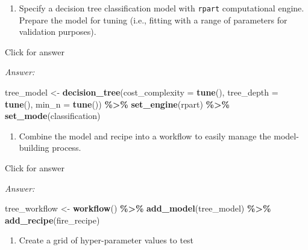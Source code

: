 \documentclass[
]{book}
\newenvironment{Shaded}{\begin{snugshade}}{\end{snugshade}}
\newcommand{\AttributeTok}[1]{\textcolor[rgb]{0.13,0.29,0.53}{#1}}
\newcommand{\FunctionTok}[1]{\textcolor[rgb]{0.13,0.29,0.53}{\textbf{#1}}}
\newcommand{\NormalTok}[1]{#1}
\newcommand{\OtherTok}[1]{\textcolor[rgb]{0.56,0.35,0.01}{#1}}
\newcommand{\SpecialCharTok}[1]{\textcolor[rgb]{0.81,0.36,0.00}{\textbf{#1}}}
\newcommand{\StringTok}[1]{\textcolor[rgb]{0.31,0.60,0.02}{#1}}
\providecommand{\tightlist}{%
  \setlength{\itemsep}{0pt}\setlength{\parskip}{0pt}}
\begin{document}
\begin{enumerate}
\def\labelenumi{\alph{enumi}.}
\setcounter{enumi}{1}
\tightlist
\item
  Specify a decision tree classification model with \texttt{rpart} computational engine. Prepare the model for tuning (i.e., fitting with a range of parameters for validation purposes).
\end{enumerate}

Click for answer

\emph{Answer:}

\begin{Shaded}
\begin{Highlighting}[]
\NormalTok{tree\_model }\OtherTok{\textless{}{-}} \FunctionTok{decision\_tree}\NormalTok{(}\AttributeTok{cost\_complexity =} \FunctionTok{tune}\NormalTok{(),}
                            \AttributeTok{tree\_depth =} \FunctionTok{tune}\NormalTok{(),}
                            \AttributeTok{min\_n =} \FunctionTok{tune}\NormalTok{()) }\SpecialCharTok{\%\textgreater{}\%} 
              \FunctionTok{set\_engine}\NormalTok{(}\StringTok{\textquotesingle{}rpart\textquotesingle{}}\NormalTok{) }\SpecialCharTok{\%\textgreater{}\%} 
              \FunctionTok{set\_mode}\NormalTok{(}\StringTok{\textquotesingle{}classification\textquotesingle{}}\NormalTok{)}
\end{Highlighting}
\end{Shaded}

\begin{enumerate}
\def\labelenumi{\alph{enumi}.}
\setcounter{enumi}{2}
\tightlist
\item
  Combine the model and recipe into a workflow to easily manage the model-building process.
\end{enumerate}

Click for answer

\emph{Answer:}

\begin{Shaded}
\begin{Highlighting}[]
\NormalTok{tree\_workflow }\OtherTok{\textless{}{-}} \FunctionTok{workflow}\NormalTok{() }\SpecialCharTok{\%\textgreater{}\%} 
                 \FunctionTok{add\_model}\NormalTok{(tree\_model) }\SpecialCharTok{\%\textgreater{}\%} 
                 \FunctionTok{add\_recipe}\NormalTok{(fire\_recipe)}
\end{Highlighting}
\end{Shaded}

\begin{enumerate}
\def\labelenumi{\alph{enumi}.}
\setcounter{enumi}{3}
\tightlist
\item
  Create a grid of hyper-parameter values to test
\end{enumerate}
\end{document}
